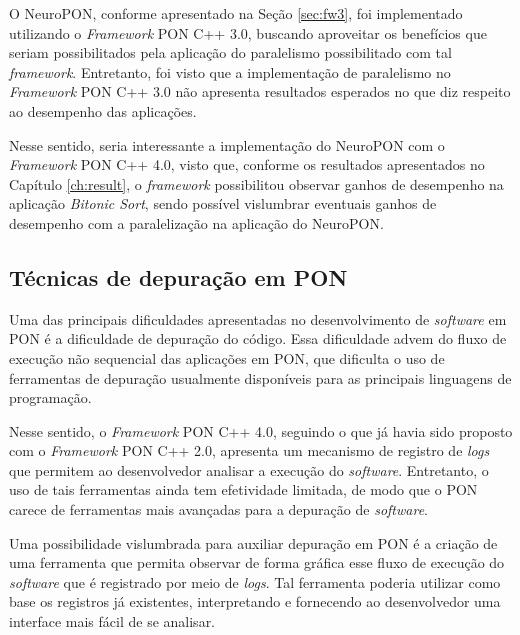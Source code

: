 O NeuroPON, conforme apresentado na Seção \ref{sec:fw3}, foi implementado
utilizando o \textit{Framework} PON C++ 3.0, buscando aproveitar os benefícios
que seriam possibilitados pela aplicação do paralelismo possibilitado com tal
\textit{framework}. Entretanto, foi visto que a implementação de paralelismo no
\textit{Framework} PON C++ 3.0 não apresenta resultados esperados no que diz
respeito ao desempenho das aplicações.

Nesse sentido, seria interessante a implementação do NeuroPON com o
\textit{Framework} PON C++ 4.0, visto que, conforme os resultados apresentados
no Capítulo \ref{ch:result}, o \textit{framework} possibilitou observar ganhos
de desempenho na aplicação \textit{Bitonic Sort}, sendo possível vislumbrar
eventuais ganhos de desempenho com a paralelização na aplicação do NeuroPON.

\subsection{Técnicas de depuração em PON}\label{sec:debug_futuro}

Uma das principais dificuldades apresentadas no desenvolvimento de
\textit{software} em PON é a dificuldade de depuração do código. Essa
dificuldade advem do fluxo de execução não sequencial das aplicações em PON, que
dificulta o uso de ferramentas de depuração usualmente disponíveis para as
principais linguagens de programação.

Nesse sentido, o \textit{Framework} PON C++ 4.0, seguindo o que já havia sido
proposto com o \textit{Framework} PON C++ 2.0, apresenta um mecanismo de
registro de \textit{logs} que permitem ao desenvolvedor analisar a execução do
\textit{software}. Entretanto, o uso de tais ferramentas ainda tem efetividade
limitada, de modo que o PON carece de ferramentas mais avançadas para a
depuração de \textit{software}.

Uma possibilidade vislumbrada para auxiliar depuração em PON é a criação de uma
ferramenta que permita observar de forma gráfica esse fluxo de execução do
\textit{software} que é registrado por meio de \textit{logs}. Tal ferramenta
poderia utilizar como base os registros já existentes, interpretando e
fornecendo ao desenvolvedor uma interface mais fácil de se analisar.
